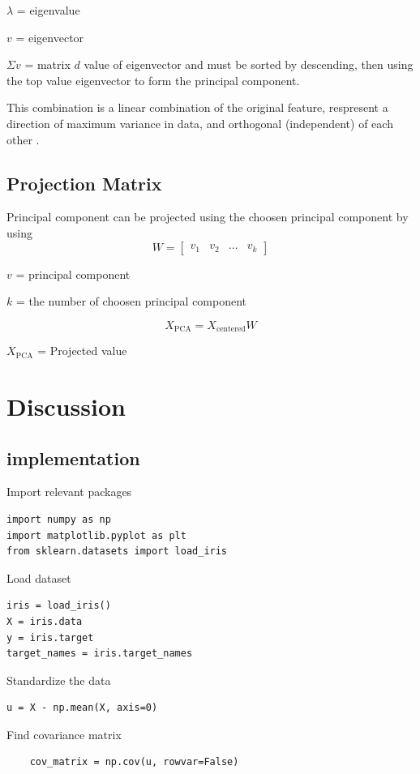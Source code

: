 \documentclass[a4paper,12pt]{article}
\begin{document}
$\lambda$ = eigenvalue 

$v$ = eigenvector

$\Sigma v $ = matrix $d$ value of eigenvector and must be sorted by descending, then using the top value eigenvector to form the principal component.

This combination is a linear combination of the original feature, respresent a direction of maximum variance in data, and orthogonal (independent) of each other \cite{shlens2014tutorial}.

\subsection{Projection Matrix}
Principal component can be projected using the choosen principal component by using 
\[
W = \begin{bmatrix} v_1 & v_2 & \dots & v_k \end{bmatrix}
\]

$v$ = principal component

$k$ = the number of choosen principal component

\[
X_{\text{PCA}} = X_{\text{centered}} W
\]

$X_\text{PCA}$ = Projected value

\section{Discussion}
\subsection{implementation}

Import relevant packages
\begin{lstlisting}
import numpy as np
import matplotlib.pyplot as plt
from sklearn.datasets import load_iris
\end{lstlisting}

Load dataset
\begin{lstlisting}
iris = load_iris()
X = iris.data
y = iris.target
target_names = iris.target_names
\end{lstlisting}

Standardize the data
\begin{lstlisting}
u = X - np.mean(X, axis=0)
\end{lstlisting}

Find covariance matrix
\begin{lstlisting}
    cov_matrix = np.cov(u, rowvar=False)
\end{lstlisting}
\end{document}
